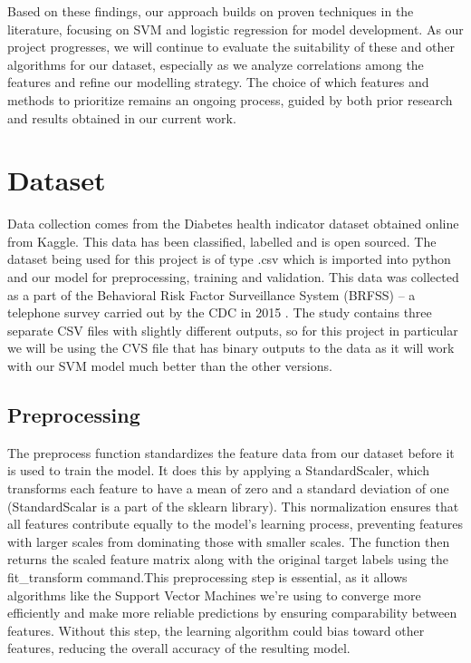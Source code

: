 \documentclass[11pt]{article}
\begin{document}
Based on these findings, our approach builds on proven techniques in the literature, focusing on SVM and logistic regression for model development. As our project progresses, we will continue to evaluate the suitability of these and other algorithms for our dataset, especially as we analyze correlations among the features and refine our modelling strategy. The choice of which features and methods to prioritize remains an ongoing process, guided by both prior research and results obtained in our current work.

\section{Dataset}

Data collection comes from the Diabetes health indicator dataset obtained online from Kaggle. This data has been classified, labelled and is open sourced. The dataset being used for this project is of type .csv which is imported into python and our model for preprocessing, training and validation. This data was collected as a part of the Behavioral Risk Factor Surveillance System (BRFSS) – a telephone survey carried out by the CDC in 2015 \cite{cdc}. The study contains three separate CSV files with slightly different outputs, so for this project in particular we will be using the CVS file that has binary outputs to the data as it will work with our SVM model much better than the other versions. 

\subsection{Preprocessing}

The preprocess function standardizes the feature data from our dataset before it is used to train the model. It does this by applying a StandardScaler, which transforms each feature to have a mean of zero and a standard deviation of one (StandardScalar is a part of the sklearn library). This normalization ensures that all features contribute equally to the model's learning process, preventing features with larger scales from dominating those with smaller scales. The function then returns the scaled feature matrix along with the original target labels using the fit\_transform command.This preprocessing step is essential, as it allows algorithms like the Support Vector Machines we're using to converge more efficiently and make more reliable predictions by ensuring comparability between features. Without this step, the learning algorithm could bias toward other features, reducing the overall accuracy of the resulting model.
\end{document}
